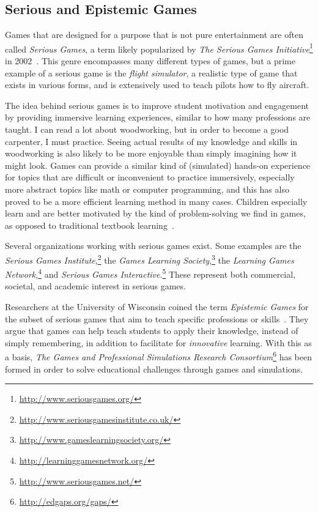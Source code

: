 \subsection{Serious and Epistemic Games}
\label{sec:serious_games}
Games that are designed for a purpose that is not pure entertainment are often called \emph{Serious Games}, a term likely popularized by \emph{The Serious Games Initiative}\footnote{\url{http://www.seriousgames.org/}} in 2002~\cite{djaouti:serious_games_origins}. This genre encompasses many different types of games, but a prime example of a serious game is the \emph{flight simulator}, a realistic type of game that exists in various forms, and is extensively used to teach pilots how to fly aircraft.

\noindent
The idea behind serious games is to improve student motivation and engagement by providing immersive learning experiences, similar to how many professions are taught. I can read a lot about woodworking, but in order to become a good carpenter, I must practice. Seeing actual results of my knowledge and skills in woodworking is also likely to be more enjoyable than simply imagining how it might look. Games can provide a similar kind of (simulated) hands-on experience for topics that are difficult or inconvenient to practice immersively, especially more abstract topics like math or computer programming, and this has also proved to be a more efficient learning method in many cases. Children especially learn and are better motivated by the kind of problem-solving we find in games, as opposed to traditional textbook learning~\cite{freitas:serious_games_new_paradigm}.

\noindent
Several organizations working with serious games exist. Some examples are the \emph{Serious Games Institute},\footnote{\url{http://www.seriousgamesinstitute.co.uk/}} the \emph{Games Learning Society},\footnote{\url{http://www.gameslearningsociety.org/}} the \emph{Learning Games Network},\footnote{\url{http://learninggamesnetwork.org/}} and \emph{Serious Games Interactive}.\footnote{\url{http://www.seriousgames.net/}} These represent both commercial, societal, and academic interest in serious games.

\noindent
Researchers at the University of Wisconsin coined the term \emph{Epistemic Games} for the subset of serious games that aim to teach specific professions or skills~\cite{shaffer:epistemic_games}. They argue that games can help teach students to apply their knowledge, instead of simply remembering, in addition to facilitate for \emph{innovative} learning. With this as a basis, \emph{The Games and Professional Simulations Research Consortium}\footnote{\url{http://edgaps.org/gaps/}} has been formed in order to solve educational challenges through games and simulations.

